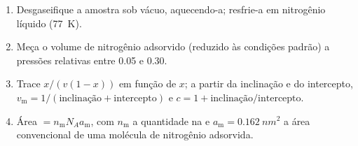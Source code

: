 \begin{method}\label{met:b3:surfaces-catalysis:bet-area}
\begin{enumerate}
  \item Desgaseifique a amostra sob vácuo, aquecendo-a; resfrie-a em nitrogênio
        líquido (\qty{77}{K}).
  \item Meça o volume de nitrogênio adsorvido (reduzido às condições padrão) a
        pressões relativas entre 0.05 e 0.30.
  \item Trace $x/(v(1 - x))$ em função de $x$; a partir da inclinação e do intercepto,
        $v_{\mathrm m} = 1/(\text{inclinação} + \text{intercepto})$ e $c = 1 + \text{inclinação}/\text{intercepto}$.
  \item Área $= n_{\mathrm m}N_Aa_{\mathrm m}$, com $n_{\mathrm m}$ a quantidade na  e $a_{\mathrm m} = \qty{0.162}{nm^2}$
        a área convencional de uma molécula de nitrogênio adsorvida.
\end{enumerate}
\end{method}


